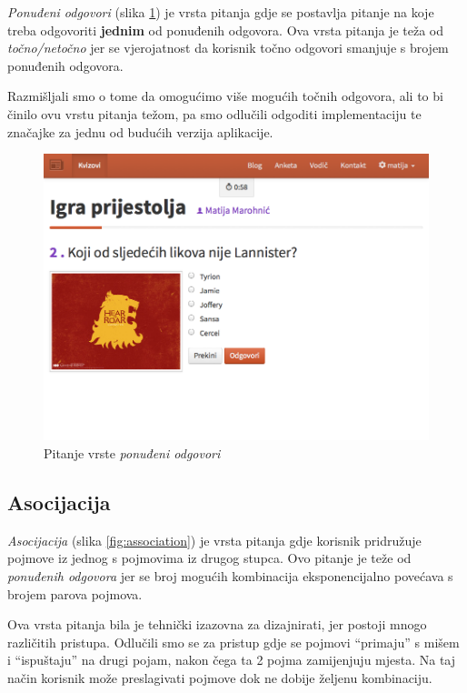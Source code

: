 \documentclass{scrreprt}
\begin{document}
\emph{Ponuđeni odgovori} (slika \ref{fig:choice}) je vrsta pitanja gdje se
postavlja pitanje na koje treba odgovoriti \textbf{jednim} od ponuđenih
odgovora. Ova vrsta pitanja je teža od \emph{točno/netočno} jer se vjerojatnost
da korisnik točno odgovori smanjuje s brojem ponuđenih odgovora.

Razmišljali smo o tome da omogućimo više mogućih točnih odgovora, ali to bi
činilo ovu vrstu pitanja težom, pa smo odlučili odgoditi implementaciju te
značajke za jednu od budućih verzija aplikacije.

\begin{figure}[H]
  \includegraphics[width=\textwidth, clip=true, trim=0 5cm 0 0, fbox]{student/choice_question}
  \caption{Pitanje vrste \emph{ponuđeni odgovori}}
  \label{fig:choice}
\end{figure}

\subsection{Asocijacija}

\emph{Asocijacija} (slika \ref{fig:association}) je vrsta pitanja gdje korisnik
pridružuje pojmove iz jednog s pojmovima iz drugog stupca. Ovo pitanje je teže
od \emph{ponuđenih odgovora} jer se broj mogućih kombinacija eksponencijalno
povećava s brojem parova pojmova.

Ova vrsta pitanja bila je tehnički izazovna za dizajnirati, jer postoji mnogo
različitih pristupa. Odlučili smo se za pristup gdje se pojmovi ``primaju'' s
mišem i ``ispuštaju'' na drugi pojam, nakon čega ta 2 pojma zamijenjuju mjesta.
Na taj način korisnik može preslagivati pojmove dok ne dobije željenu
kombinaciju.
\end{document}
